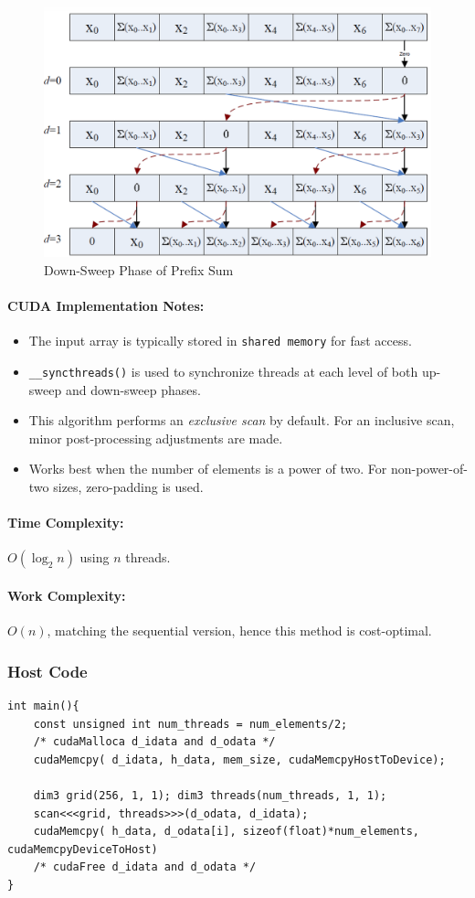 \documentclass[12pt]{book}
\begin{document}
\begin{figure}[H]
    \centering
    \includegraphics[width=0.6\linewidth]{images/downsweep.png}
    \caption{Down-Sweep Phase of Prefix Sum}
    \label{fig:downsweep}
\end{figure}

\paragraph{CUDA Implementation Notes:}
\begin{itemize}
    \item The input array is typically stored in \texttt{shared memory} for fast access.
    \item \texttt{\_\_syncthreads()} is used to synchronize threads at each level of both up-sweep and down-sweep phases.
    \item This algorithm performs an \textit{exclusive scan} by default. For an inclusive scan, minor post-processing adjustments are made.
    \item Works best when the number of elements is a power of two. For non-power-of-two sizes, zero-padding is used.
\end{itemize}

\paragraph{Time Complexity:} $O(\log_2 n)$ using $n$ threads.

\paragraph{Work Complexity:} $O(n)$, matching the sequential version, hence this method is cost-optimal.


\subsubsection*{Host Code}
\begin{lstlisting}[style=cppstyle]
int main(){
    const unsigned int num_threads = num_elements/2;
    /* cudaMalloca d_idata and d_odata */
    cudaMemcpy( d_idata, h_data, mem_size, cudaMemcpyHostToDevice);

    dim3 grid(256, 1, 1); dim3 threads(num_threads, 1, 1);
    scan<<<grid, threads>>>(d_odata, d_idata);
    cudaMemcpy( h_data, d_odata[i], sizeof(float)*num_elements, cudaMemcpyDeviceToHost)
    /* cudaFree d_idata and d_odata */
}
\end{lstlisting}
\end{document}
